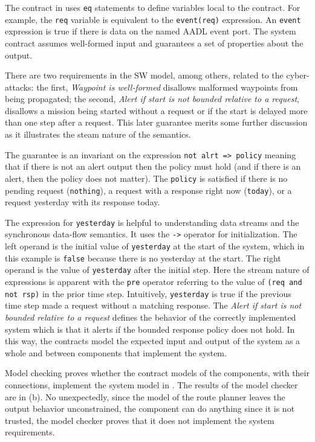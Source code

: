 The contract in  uses \texttt{eq} statements to define variables local to the contract. For example, the \texttt{req} variable is equivalent to the \texttt{event(req)} expression. An \texttt{event} expression is true if there is data on the named AADL event port. The system contract assumes well-formed input and guarantees a set of properties about the output.

There are two requirements in the SW model, among others, related to the cyber-attacks: the first, \emph{Waypoint is well-formed} disallows malformed waypoints from being propagated; the second, \emph{Alert if start is not bounded relative to a request}, disallows a mission being started without a request or if the start is delayed more than one step after a request. This later guarantee merits some further discussion as it illustrates the steam nature of the semantics.

The guarantee is an invariant on the expression \texttt{not alrt => policy} meaning that if there is not an alert output then the policy must hold (and if there is an alert, then the policy does not matter). The \texttt{policy} is satisfied if there is no pending request (\texttt{nothing}), a request with a response right now (\texttt{today}), or a request yesterday with its response today. 

The expression for \texttt{yesterday} is helpful to understanding data streams and the synchronous data-flow semantics. It uses the \texttt{->} operator for initialization. The left operand is the initial value of \texttt{yesterday} at the start of the system, which in this example is \texttt{false} because there is no yesterday at the start.  The right operand is the value of \texttt{yesterday} after the initial step. Here the stream nature of expressions is apparent with the \texttt{pre} operator referring to the value of \texttt{(req and not rsp)} in the prior time step. Intuitively, \texttt{yesterday} is true if the previous time step made a request without a matching response. The \emph{Alert if start is not bounded relative to a request} defines the behavior of the correctly implemented system which is that it alerts if the bounded response policy does not hold. In this way, the contracts model the expected input and output of the system as a whole and between components that implement the system.

Model checking proves whether the contract models of the components, with their connections, implement the system model in . The results of the model checker are in (b). No unexpectedly, since the model of the route planner leaves the output behavior unconstrained, the component can do anything since it is not trusted, the model checker proves that it does not implement the system requirements.

